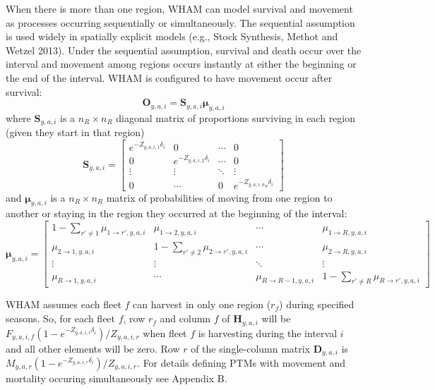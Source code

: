 \documentclass[
]{article}
\begin{document}
When there is more than one region, WHAM can model survival and movement as processes occurring sequentially or simultaneously. The sequential assumption is used widely in spatially explicit models (e.g., Stock Synthesis, Methot and Wetzel 2013). Under the sequential assumption, survival and death occur over the interval and movement among regions occurs instantly at either the beginning or the end of the interval. WHAM is configured to have movement occur after survival:
\begin{equation*}
  \mathbf{O}_{y,a,i} = \mathbf{S}_{y,a,i}\boldsymbol{\mu}_{y,a,i}
\end{equation*}
where \(\mathbf{S}_{y,a,i}\) is a \(n_R \times n_R\) diagonal matrix of proportions surviving in each region (given they start in that region)
\begin{equation*}
\mathbf{S}_{y,a,i} = 
  \begin{bmatrix}
    e^{-Z_{y,a,i,1}\delta_i} & 0 & \cdots & 0 \\
    0 & e^{-Z_{y,a,i,2}\delta_i} & \cdots & 0 \\
    \vdots & \vdots & \ddots & \vdots \\
    0 & \cdots & 0 & e^{-Z_{y,a,i,n_R}\delta_i}
  \end{bmatrix}
\end{equation*}
and \(\boldsymbol{\mu}_{y,a,i}\) is a \(n_R \times n_R\) matrix of probabilities of moving from one region to another or staying in the region they occurred at the beginning of the interval:
\begin{equation*}
\boldsymbol{\mu}_{y,a,i} = 
  \begin{bmatrix}
    1-\sum_{r' \neq 1} \mu_{1\rightarrow r',y,a,i} & \mu_{1\rightarrow 2,y,a,i} & \cdots & \mu_{1\rightarrow R,y,a,i} \\
    \mu_{2\rightarrow 1,y,a,i} & 1-\sum_{r' \neq 2} \mu_{2\rightarrow r',y,a,i} & \cdots & \mu_{2\rightarrow R,y,a,i} \\
    \vdots & \vdots & \ddots & \vdots \\
    \mu_{R\rightarrow 1,y,a,i} & \cdots & \mu_{R\rightarrow R-1,y,a,i} & 1-\sum_{r' \neq R} \mu_{R\rightarrow r',y,a,i}
  \end{bmatrix}
\end{equation*}

WHAM assumes each fleet \(f\) can harvest in only one region (\(r_f\)) during specified seasons. So, for each fleet \(f\), row \(r_f\) and column \(f\) of \(\mathbf{H}_{y,a,i}\) will be \(F_{y,a,i,f}\left(1 - e^{-Z_{y,a,i,r}\delta_i}\right)/Z_{y,a,i,r}\) when fleet \(f\) is harvesting during the interval \(i\) and all other elements will be zero. Row \(r\) of the single-column matrix \(\mathbf{D}_{y,a,i}\) is \(M_{y,a,r}\left(1 - e^{-Z_{y,a,i,r}\delta_i}\right)/Z_{y,a,i,r}\). For details defining PTMs with movement and mortality occuring simultaneously see Appendix B.
\end{document}
